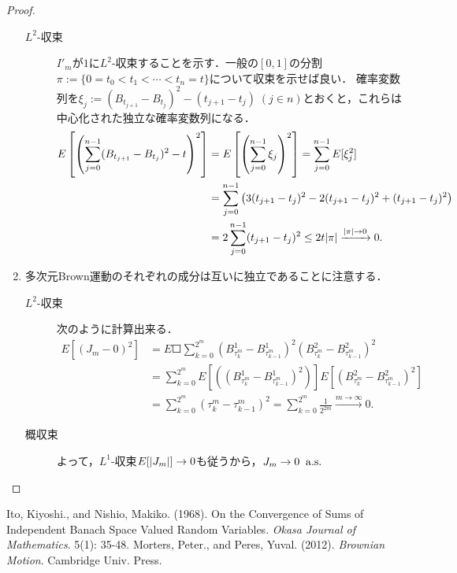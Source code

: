 \documentclass[uplatex,dvipdfmx]{jsarticle}
\begin{document}
\begin{proof}
\begin{enumerate}
\begin{description}
            \item[$L^2$-収束]
            $I'_m$が$1$に$L^2$-収束することを示す．一般の$[0,1]$の分割$\pi:=\{0=t_0<t_1<\cdots<t_n=t\}$について収束を示せば良い．
            確率変数列を$\xi_j:=(B_{t_{j+1}}-B_{t_j})^2-(t_{j+1}-t_j)\;(j\in n)$とおくと，これらは中心化された独立な確率変数列になる．
            \begin{align*}
                E\left[\left(\sum^{n-1}_{j=0}(B_{t_{j+1}}-B_{t_j})^2-t\right)^2\right]&=E\left[\left(\sum^{n-1}_{j=0}\xi_j\right)^2\right]=\sum^{n-1}_{j=0}E[\xi^2_j]\\
                &=\sum^{n-1}_{j=0}\left(3(t_{j+1}-t_j)^2-2(t_{j+1}-t_j)^2+(t_{j+1}-t_j)^2\right)\\
                &=2\sum^{n-1}_{j=0}(t_{j+1}-t_j)^2\le 2t\lvert\pi\rvert\xrightarrow{\lvert\pi\rvert\to0}0.
            \end{align*}
        \end{description}
        \item 多次元Brown運動のそれぞれの成分は互いに独立であることに注意する．
        \begin{description}
            \item[$L^2$-収束] 次のように計算出来る．
            \begin{align*}
                E[(J_m-0)^2]&=E\Square{\sum^{2^m}_{k=0}(B^1_{\tau^m_{k}}-B^1_{\tau^m_{k-1}})^2(B^2_{\tau^m_{k}}-B^2_{\tau^m_{k-1}})^2}\\
                &=\sum^{2^m}_{k=0}E[((B^1_{\tau^m_{k}}-B^1_{\tau^m_{k-1}})^2)]E[(B^2_{\tau^m_{k}}-B^2_{\tau^m_{k-1}})^2]\\
                &=\sum^{2^m}_{k=0}(\tau^m_k-\tau^m_{k-1})^2=\sum^{2^m}_{k=0}\frac{1}{2^{2m}}\xrightarrow{m\to\infty}0.
            \end{align*}
            \item[概収束] よって，$L^1$-収束$E[\lvert J_m\rvert]\to0$も従うから，$J_m\to0\;\;\mathrm{a.s.}$
        \end{description}
    \end{enumerate}
\end{proof}

\begin{thebibliography}{9}
    Ito, Kiyoshi., and Nishio, Makiko. (1968). On the Convergence of Sums of Independent Banach Space Valued Random Variables. \textit{Okasa Journal of Mathematics}. 5(1): 35-48.
    Morters, Peter., and Peres, Yuval. (2012). \textit{Brownian Motion}. Cambridge Univ. Press.
\end{thebibliography}
\end{document}
